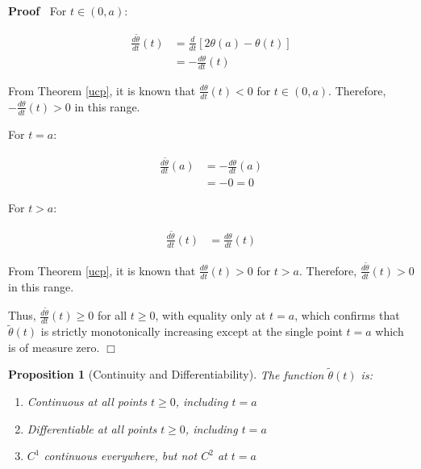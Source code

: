 \documentclass{article}
\newenvironment{proof}{\noindent\textbf{Proof\ }}{\hspace*{\fill}$\Box$\medskip}
\newtheorem{proposition}{Proposition}
\begin{document}
\begin{proof}
  For $t \in (0, a)$:
  
  \begin{align}
    \frac{d \tilde{\theta}}{dt} (t) & = \frac{d}{dt}  [2 \theta (a) - \theta
    (t)] \\
    & = - \frac{d \theta}{dt} (t) 
  \end{align}
  
  From Theorem \ref{ucp}, it is known that $\frac{d \theta}{dt} (t) < 0$ for
  $t \in (0, a)$. Therefore, $- \frac{d \theta}{dt} (t) > 0$ in this range.
  
  For $t = a$:
  
  \begin{align}
    \frac{d \tilde{\theta}}{dt} (a) & = - \frac{d \theta}{dt} (a) \\
    & = - 0 = 0 
  \end{align}
  
  For $t > a$:
  
  \begin{align}
    \frac{d \tilde{\theta}}{dt} (t) & = \frac{d \theta}{dt} (t) 
  \end{align}
  
  From Theorem \ref{ucp}, it is known that $\frac{d \theta}{dt} (t) > 0$ for
  $t > a$. Therefore, $\frac{d \tilde{\theta}}{dt} (t) > 0$ in this range.
  
  Thus, $\frac{d \tilde{\theta}}{dt} (t) \geq 0$ for all $t \geq 0$, with
  equality only at $t = a$, which confirms that $\tilde{\theta} (t)$ is
  strictly monotonically increasing except at the single point $t = a$ which
  is of measure zero.
\end{proof}

\begin{proposition}[Continuity and Differentiability]
  The function $\tilde{\theta} (t)$ is:
  \begin{enumerate}
    \item Continuous at all points $t \geq 0$, including $t = a$
    
    \item Differentiable at all points $t \geq 0$, including $t = a$
    
    \item $C^1$ continuous everywhere, but not $C^2$ at $t = a$
  \end{enumerate}
\end{proposition}
\end{document}
